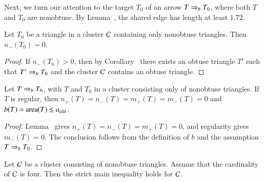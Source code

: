 Next, we turn our attention to the target $T_0$ of an arrow $T\Rightarrow_{b} T_0$,
where both $T$ and $T_0$ are nonobtuse.  By
Lemma~, the shared edge has length at least
$1.72$.

\begin{lemma} 
  Let $T_0$ be a triangle in a cluster $\mathcal C$ containing only nonobtuse
  triangles.  Then $n_-(T_0)=0$.
\end{lemma}

\begin{proof} 
  If $n_-(T_0)>0$, then by Corollary~ there
  exists an obtuse triangle $T'$ such that $T'\Rightarrow_{b} T_0$ and the
  cluster $\mathcal C$ contains an obtuse triangle.
\end{proof}

\begin{lemma}
  Let $T\Rightarrow_{b} T_0$, with $T$ and $T_0$ in a cluster consisting
  only of nonobtuse triangles. If $T$ is regular, then
  $n_+(T)=n_-(T)=m_+(T)=m_-(T)=0$ and
  $b(T)={\operatorname{area}}(T)\le a_\text{crit}$.
\end{lemma}

\begin{proof}
  Lemma~ gives $n_+(T)=n_-(T)=m_+(T)=0$,
  and regularity gives $m_-(T)=0$. The conclusion follows from
  the definition of $b$ and the assumption $T\Rightarrow_{b} T_0$.
\end{proof}

\begin{lemma}
  Let $\mathcal C$ be a cluster consisting of nonobtuse triangles.  Assume
  that the cardinality of $\mathcal C$ is four.  Then the strict main
  inequality holds for $\mathcal C$.
\end{lemma}

